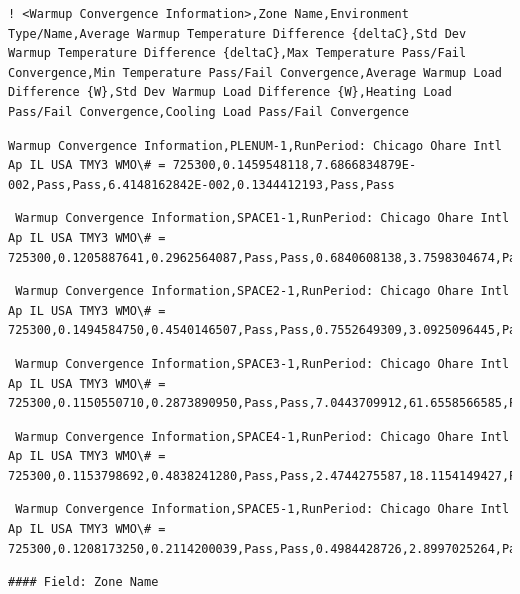 \begin{lstlisting}
! <Warmup Convergence Information>,Zone Name,Environment Type/Name,Average Warmup Temperature Difference {deltaC},Std Dev Warmup Temperature Difference {deltaC},Max Temperature Pass/Fail Convergence,Min Temperature Pass/Fail Convergence,Average Warmup Load Difference {W},Std Dev Warmup Load Difference {W},Heating Load Pass/Fail Convergence,Cooling Load Pass/Fail Convergence
\end{lstlisting}

\begin{lstlisting}
Warmup Convergence Information,PLENUM-1,RunPeriod: Chicago Ohare Intl Ap IL USA TMY3 WMO\# = 725300,0.1459548118,7.6866834879E-002,Pass,Pass,6.4148162842E-002,0.1344412193,Pass,Pass
\end{lstlisting}

\begin{lstlisting}
 Warmup Convergence Information,SPACE1-1,RunPeriod: Chicago Ohare Intl Ap IL USA TMY3 WMO\# = 725300,0.1205887641,0.2962564087,Pass,Pass,0.6840608138,3.7598304674,Pass,Pass
\end{lstlisting}

\begin{lstlisting}
 Warmup Convergence Information,SPACE2-1,RunPeriod: Chicago Ohare Intl Ap IL USA TMY3 WMO\# = 725300,0.1494584750,0.4540146507,Pass,Pass,0.7552649309,3.0925096445,Pass,Pass
\end{lstlisting}

\begin{lstlisting}
 Warmup Convergence Information,SPACE3-1,RunPeriod: Chicago Ohare Intl Ap IL USA TMY3 WMO\# = 725300,0.1150550710,0.2873890950,Pass,Pass,7.0443709912,61.6558566585,Pass,Pass
\end{lstlisting}

\begin{lstlisting}
 Warmup Convergence Information,SPACE4-1,RunPeriod: Chicago Ohare Intl Ap IL USA TMY3 WMO\# = 725300,0.1153798692,0.4838241280,Pass,Pass,2.4744275587,18.1154149427,Pass,Pass
\end{lstlisting}

\begin{lstlisting}
 Warmup Convergence Information,SPACE5-1,RunPeriod: Chicago Ohare Intl Ap IL USA TMY3 WMO\# = 725300,0.1208173250,0.2114200039,Pass,Pass,0.4984428726,2.8997025264,Pass,Pass
\end{lstlisting}

\begin{lstlisting}
#### Field: Zone Name
\end{lstlisting}

